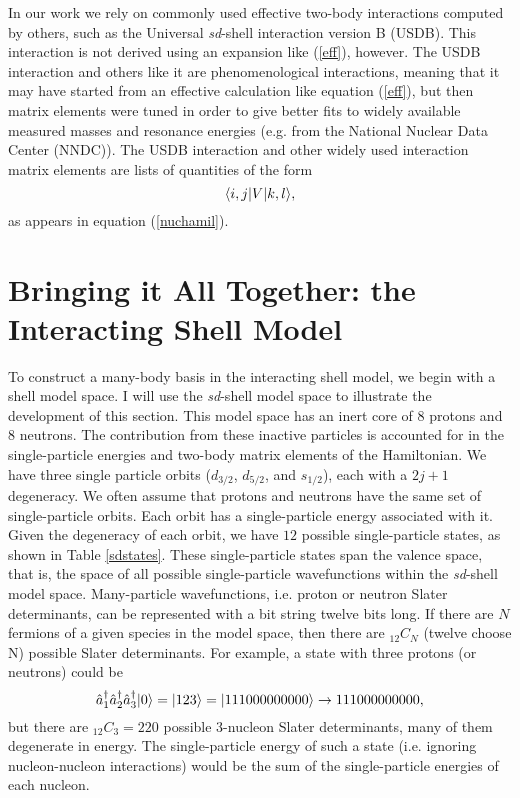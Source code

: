 In our work we rely on commonly used effective two-body interactions computed by others,
such as the Universal \textit{sd}-shell interaction version B (USDB)\cite{usdb}. This interaction is not derived using an expansion 
like (\ref{eff}), however. The USDB interaction and others like it are phenomenological
interactions, meaning that it may have started from an effective calculation like
equation (\ref{eff}), but then matrix elements were tuned in order to give better
fits to widely available measured masses and resonance energies (e.g. from the National Nuclear Data Center (NNDC))\cite{nndc}. The USDB interaction 
and other widely used interaction matrix elements are lists of quantities of the form
\begin{equation}
    \langle i,j|V|k,l\rangle,
\end{equation}
as appears in equation (\ref{nuchamil}). 

\section{Bringing it All Together: the Interacting Shell Model}

To construct a many-body basis in the interacting shell model, we begin with 
a shell model space. I will use the \textit{sd}-shell model space to illustrate
the development of this section. This model space has an inert core of
8 protons and 8 neutrons. The contribution from these inactive particles is accounted
for in the single-particle energies and two-body matrix elements of the Hamiltonian. 
We have three single particle orbits ($d_{3/2}$, $d_{5/2}$, and $s_{1/2}$), 
each with a $2j+1$ degeneracy. 
We often assume that protons and neutrons have the same set of single-particle orbits.
Each orbit has a single-particle energy associated with it. Given the degeneracy of each orbit, 
we have $12$ possible single-particle states, as shown in Table \ref{sdstates}.
These single-particle states span the valence space, that is, the space of 
all possible single-particle wavefunctions within the \textit{sd}-shell model space.
Many-particle wavefunctions, i.e. proton or neutron Slater determinants, can be represented with a 
bit string twelve bits long. If there are $N$ fermions of a given species in the model space,
then there are $_{12}C_N$ (twelve choose N) possible Slater determinants. For 
example, a state with three protons (or neutrons) could be
\begin{equation}\label{slaterex}
    \hat{a}_1^\dagger\hat{a}_2^\dagger\hat{a}_3^\dagger|0\rangle = |123\rangle = |111000000000\rangle \to 111000000000,
\end{equation}
but there are $_{12}C_3=220$ possible 3-nucleon Slater determinants, many of 
them degenerate in energy.
The single-particle energy of such a state (i.e. ignoring nucleon-nucleon interactions) would be
the sum of the single-particle energies of each nucleon.

